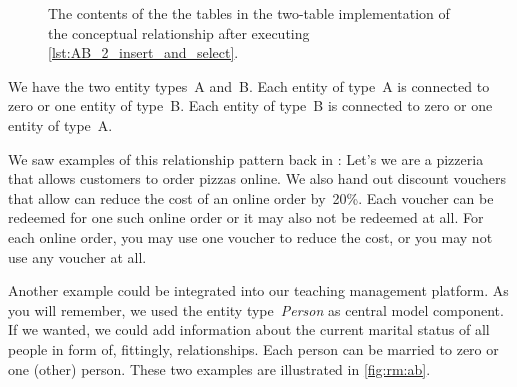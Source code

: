 %
%
%
%
%
%
%
\begin{figure}%
\centering%
\floatSep%
%
\floatSep%
%
\floatSep%
\caption{The contents of the the tables in the two-table implementation of the  conceptual relationship after executing \cref{lst:AB_2_insert_and_select}.}%
\label{fig:rm:ab:2:tables}%
\end{figure}%
%
%
%
We have the two entity types~A and~B.
Each entity of type~A is connected to zero or one entity of type~B.
Each entity of type~B is connected to zero or one entity of type~A.

We saw examples of this relationship pattern back in :
Let's we are a pizzeria that allows customers to order pizzas online.
We also hand out discount vouchers that allow can reduce the cost of an online order by~20\%.
Each voucher can be redeemed for one such online order or it may also not be redeemed at all.
For each online order, you may use one voucher to reduce the cost, or you may not use any voucher at all.

Another example could be integrated into our teaching management platform.
As you will remember, we used the entity type~\emph{Person} as central model component.
If we wanted, we could add information about the current marital status of all people in form of, fittingly, relationships.
Each person can be married to zero or one (other) person.
These two examples are illustrated in \cref{fig:rm:ab}.

